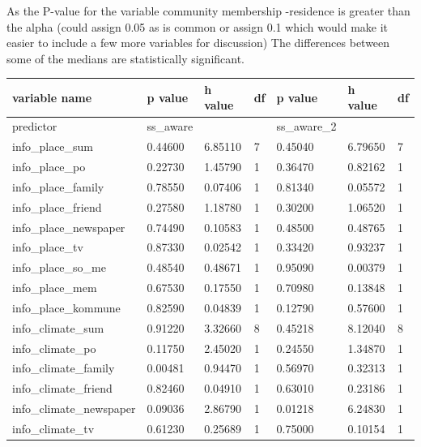 As the P-value for the variable community membership -residence is greater than the alpha (could assign 0.05 as is common or assign 0.1 which would make it easier to include a few more variables for discussion) The differences between some of the medians are statistically significant.

\begin{table}[h]
    \centering
    \begin{tabular}{|l|l|l|l|l|l|l|}
    \hline
        variable name & p value & h value & df & p value & h value & df \\ \hline
        predictor & ss\_aware & ~ & ~ & ss\_aware\_2 & ~ & ~ \\ \hline
        info\_place\_sum & 0.44600 & 6.85110 & 7 & 0.45040 & 6.79650 & 7 \\ \hline
        info\_place\_po & 0.22730 & 1.45790 & 1 & 0.36470 & 0.82162 & 1 \\ \hline
        info\_place\_family & 0.78550 & 0.07406 & 1 & 0.81340 & 0.05572 & 1 \\ \hline
        info\_place\_friend & 0.27580 & 1.18780 & 1 & 0.30200 & 1.06520 & 1 \\ \hline
        info\_place\_newspaper & 0.74490 & 0.10583 & 1 & 0.48500 & 0.48765 & 1 \\ \hline
        info\_place\_tv & 0.87330 & 0.02542 & 1 & 0.33420 & 0.93237 & 1 \\ \hline
        info\_place\_so\_me & 0.48540 & 0.48671 & 1 & 0.95090 & 0.00379 & 1 \\ \hline
        info\_place\_mem & 0.67530 & 0.17550 & 1 & 0.70980 & 0.13848 & 1 \\ \hline
        info\_place\_kommune & 0.82590 & 0.04839 & 1 & 0.12790 & 0.57600 & 1 \\ \hline
        info\_climate\_sum & 0.91220 & 3.32660 & 8 & 0.45218 & 8.12040 & 8 \\ \hline
        info\_climate\_po & 0.11750 & 2.45020 & 1 & 0.24550 & 1.34870 & 1 \\ \hline
        info\_climate\_family & \cellcolor[HTML]{7df9ff} 0.00481 & 0.94470 & 1 & 0.56970 & 0.32313 & 1 \\ \hline
        info\_climate\_friend & 0.82460 & 0.04910 & 1 & 0.63010 & 0.23186 & 1 \\ \hline
        info\_climate\_newspaper & 0.09036 & 2.86790 & 1 & \cellcolor[HTML]{7df9ff} 0.01218 & 6.24830 & 1 \\ \hline
        info\_climate\_tv & 0.61230 & 0.25689 & 1 & 0.75000 & 0.10154 & 1 \\ \hline

\end{tabular}
\end{table}
